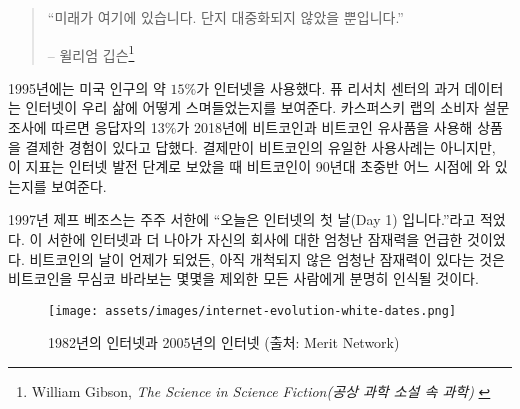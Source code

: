 \begin{quotation}\begin{samepage}
		\enquote{미래가 여기에 있습니다. 단지 대중화되지 않았을 뿐입니다.}
		\begin{flushright} -- 윌리엄 깁슨\footnote{William Gibson, \textit{The Science in Science Fiction(공상 과학 소설 속 과학)} \cite{william-gibson}}
\end{flushright}\end{samepage}\end{quotation}

\begin{comment}
	In 1995, about $15\%$ of American adults used the internet. Historical
	data from the Pew Research Center~\cite{pew-research} shows how the internet has woven
	itself into all our lives. According to a consumer survey by Kaspersky
	Lab~\cite{web:kaspersky}, 13\% of respondents have used Bitcoin and its clones to pay for
	goods in 2018. While payments aren't the only use-case of bitcoin, it is
	some indication of where we are in Internet time: in the early- to
	mid-90s.
\end{comment}
1995년에는 미국 인구의 약 $15\%$가 인터넷을 사용했다.
퓨 리서치 센터\cite{pew-research}의 과거 데이터는 인터넷이 우리 삶에 어떻게 스며들었는지를 보여준다.
카스퍼스키 랩\cite{web:kaspersky}의 소비자 설문 조사에 따르면 
응답자의 13\%가 2018년에 비트코인과 비트코인 유사품을 사용해 상품을 결제한 경험이 있다고 답했다.
결제만이 비트코인의 유일한 사용사례는 아니지만, 
이 지표는 인터넷 발전 단계로 보았을 때 비트코인이 90년대 초중반 어느 시점에 와 있는지를 보여준다.

\begin{comment}
	In 1997, Jeff Bezos stated in a letter to shareholders~\cite{bezos-letter} that
	\enquote{this is Day 1 for the Internet,} recognizing the great untapped
	potential for the internet and, by extension, his company. Whatever day this is
	for Bitcoin, the vast amounts of untapped potential are clear to all but the
	most casual observer.
\end{comment}
1997년 제프 베조스는 주주 서한\cite{bezos-letter}에 \enquote{오늘은 인터넷의 첫 날(Day 1) 입니다.}라고 적었다.
이 서한에 인터넷과 더 나아가 자신의 회사에 대한 엄청난 잠재력을 언급한 것이었다.
비트코인의 날이 언제가 되었든, 아직 개척되지 않은 엄청난 잠재력이 있다는 것은
비트코인을 무심코 바라보는 몇몇을 제외한 모든 사람에게 분명히 인식될 것이다.


\begin{figure}
	\texttt{[image: assets/images/internet-evolution-white-dates.png]}
	\caption{1982년의 인터넷과 2005년의 인터넷 (출처: Merit Network)}
	\label{fig:internet-evolution-white-dates}
\end{figure}

